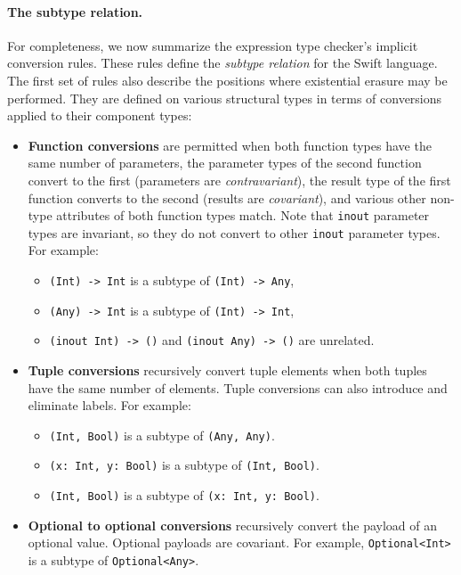 \documentclass[../generics]{subfiles}
\begin{document}
\paragraph{The subtype relation.}
For completeness, we now summarize the expression type checker's implicit conversion rules. These rules define the \emph{subtype relation} for the Swift language. The first set of rules also describe the positions where existential erasure may be performed. They are defined on various structural types in terms of conversions applied to their component types:
\begin{itemize}
\item {}\textbf{Function conversions} are permitted when both function types have the same number of parameters, the parameter types of the second function convert to the first (parameters are \emph{contravariant}), the result type of the first function converts to the second (results are \emph{covariant}), and various other non-type attributes of both function types match. Note that \texttt{inout} parameter types are invariant, so they do not convert to other \texttt{inout} parameter types. For example:
\begin{itemize}
\item \verb|(Int) -> Int| is a subtype of \verb|(Int) -> Any|,
\item \verb|(Any) -> Int| is a subtype of \verb|(Int) -> Int|,
\item \verb|(inout Int) -> ()| and \verb|(inout Any) -> ()| are unrelated.
\end{itemize}

\item {}\textbf{Tuple conversions} recursively convert tuple elements when both tuples have the same number of elements. Tuple conversions can also introduce and eliminate labels. For example:
\begin{itemize}
\item \verb|(Int, Bool)| is a subtype of \verb|(Any, Any)|.
\item \verb|(x: Int, y: Bool)| is a subtype of \verb|(Int, Bool)|.
\item \verb|(Int, Bool)| is a subtype of \verb|(x: Int, y: Bool)|.
\end{itemize}

\item {}\textbf{Optional to optional conversions} recursively convert the payload of an optional value. Optional payloads are covariant. For example, \verb|Optional<Int>| is a subtype of \verb|Optional<Any>|.


\end{itemize}
\end{document}
